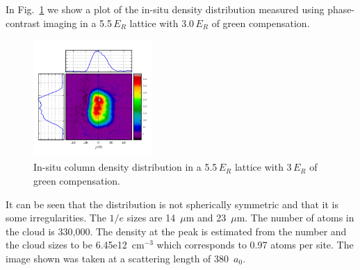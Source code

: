 \documentclass[11pt,letter]{article}
\begin{document}
 
In Fig.~\ref{fig:in-situ-density} we show a plot of the in-situ density
distribution measured using phase-contrast imaging in a 5.5\,$E_{R}$ lattice
with 3.0\,$E_{R}$ of green compensation.
\begin{figure}
\centering 
\includegraphics[width=0.4\textwidth]{figures_140130/densityinspec_380a0_avg.png}
\caption[In-situ column density distribution]{\small In-situ column density
distribution in a 5.5\,$E_{R}$ lattice with 3\,$E_{R}$ of green compensation.
} \label{fig:in-situ-density}
\end{figure}
It can be seen that the distribution is not spherically symmetric and that it is some irregularities.  The $1/e$ sizes are 14~$\mu$m
and 23~$\mu$m.  The number of atoms in the cloud is 330,000.  The density at
the peak is estimated from the number and the cloud sizes to be
6.45e12~$\mathrm{cm}^{-3}$ which corresponds to 0.97 atoms per site.   The
image shown was taken at a scattering length of 380~$a_{0}$.
\end{document}
